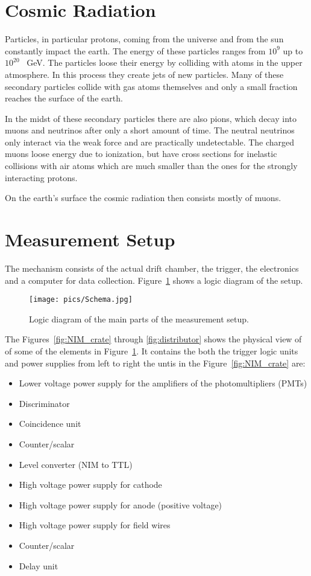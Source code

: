 \documentclass[12pt]{article}
\begin{document}
\section{Cosmic Radiation}

Particles, in particular protons, coming from the universe and from the sun constantly impact the earth. The energy of these particles ranges from $10^9$ up to $10^{20}$ \SI{}{\giga\electronvolt}. The particles loose their energy by colliding with atoms in the upper atmosphere. In this process they create jets of new particles. Many of these secondary particles collide with gas atoms themselves and only a small fraction reaches the surface of the earth.

 In the midst of these secondary particles there are also pions, which decay into muons and neutrinos after only a short amount of time. The neutral neutrinos only interact via the weak force and are practically undetectable. The charged muons loose energy due to ionization, but have cross sections for inelastic collisions with air atoms which are much smaller than the ones for the strongly interacting protons.

On the earth's surface the cosmic radiation then consists mostly of muons.

\section{Measurement Setup}

The mechanism consists of the actual drift chamber, the trigger, the electronics and a computer for data collection. Figure~\ref{fig:schema} shows a logic diagram of the setup. 

\begin{figure}[!h]
\texttt{[image: pics/Schema.jpg]}
\centering
\caption{Logic diagram of the main parts of the measurement setup.}
\label{fig:schema}
\end{figure}

The Figures~\ref{fig:NIM_crate} through \ref{fig:distributor} shows the physical view of of some of the elements in Figure~\ref{fig:schema}. It contains the both the trigger logic units and power supplies from left to right the untis in the Figure~\ref{fig:NIM_crate} are:
\begin{itemize}
\item Lower voltage power supply for the amplifiers of the photomultipliers (PMTs)
\item Discriminator
\item Coincidence unit
\item Counter/scalar
\item Level converter (NIM to TTL)
\item High voltage power supply for cathode
\item High voltage power supply for anode (positive voltage)
\item High voltage power supply for field wires
\item Counter/scalar 
\item Delay unit
\end{itemize}
\end{document}
